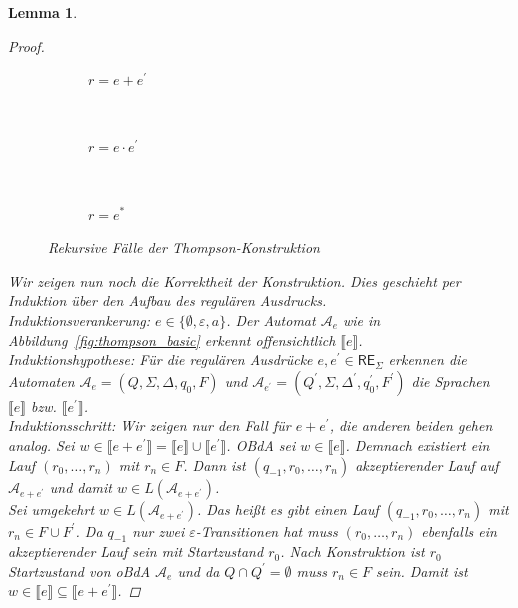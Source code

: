 \documentclass[11pt, a4paper]{article}
\theoremstyle{definition}
\theoremstyle{plain}
\newtheorem{lemma}[definition]{Lemma}
\numberwithin{equation}{section}
\begin{document}
\begin{lemma}
\begin{proof}
		\begin{figure}
			\centering
			\begin{subfigure}[b]{.9\textwidth}
				\centering
				
				\caption{\( r = e + e^\prime \)}
				\label{fig:thompson_plus}
			\end{subfigure}\\
			\begin{subfigure}[b]{.9\textwidth}
				\centering
				
				\caption{\( r = e \cdot e^\prime \)}
				\label{fig:thompson_cat}
			\end{subfigure}\\
			\begin{subfigure}[b]{.9\textwidth}
				\centering
				
				\caption{\( r = e^\ast \)}
				\label{fig:thompson_star}
			\end{subfigure}
			\caption{Rekursive Fälle der Thompson-Konstruktion}
			\label{fig:thompson_recursive}
		\end{figure}
		Wir zeigen nun noch die Korrektheit der Konstruktion. Dies geschieht per Induktion über den Aufbau des regulären Ausdrucks.\\
		Induktionsverankerung: \( e \in \{\emptyset, \varepsilon, a\} \). Der Automat \( \mathcal{A}_e \) wie in Abbildung~\ref{fig:thompson_basic} erkennt offensichtlich \( \llbracket e \rrbracket \).\checkmark\\
		Induktionshypothese: Für die regulären Ausdrücke \( e, e^\prime \in \mathsf{RE}_\Sigma \) erkennen die Automaten \( \mathcal{A}_e = (Q, \Sigma, \Delta, q_0, F) \) und \( \mathcal{A}_{e^\prime} = (Q^\prime, \Sigma, \Delta^\prime, q_0^\prime, F^\prime) \) die Sprachen \( \llbracket e \rrbracket \) bzw. \( \llbracket e^\prime \rrbracket \).\\
		Induktionsschritt: Wir zeigen nur den Fall für \( e + e^\prime \), die anderen beiden gehen analog.
		Sei \( w \in \llbracket e + e^\prime \rrbracket = \llbracket e \rrbracket \cup \llbracket e^\prime \rrbracket \). OBdA sei \( w \in \llbracket e \rrbracket \). Demnach existiert ein Lauf \( (r_0, \ldots, r_n) \) mit \( r_n \in F \). Dann ist \( (q_{-1}, r_0, \ldots, r_n) \) akzeptierender Lauf auf \( \mathcal{A}_{e+e^\prime} \) und damit \( w \in L(\mathcal{A}_{e+e^\prime}) \).\\
		Sei umgekehrt \( w \in L(\mathcal{A}_{e+e^\prime}) \). Das heißt es gibt einen Lauf \( (q_{-1}, r_0, \ldots, r_n) \) mit \( r_n \in F \cup F^\prime \). Da \( q_{-1} \) nur zwei \(\varepsilon\)-Transitionen hat muss \( (r_0, \ldots, r_n) \) ebenfalls ein akzeptierender Lauf sein mit Startzustand \( r_0 \). Nach Konstruktion ist \( r_0 \) Startzustand von oBdA \( \mathcal{A}_e \) und da \( Q \cap Q^\prime = \emptyset \) muss \( r_n \in F \) sein. Damit ist \( w \in \llbracket e \rrbracket \subseteq \llbracket e+e^\prime \rrbracket \).
	\end{proof}
\end{lemma}
\end{document}
